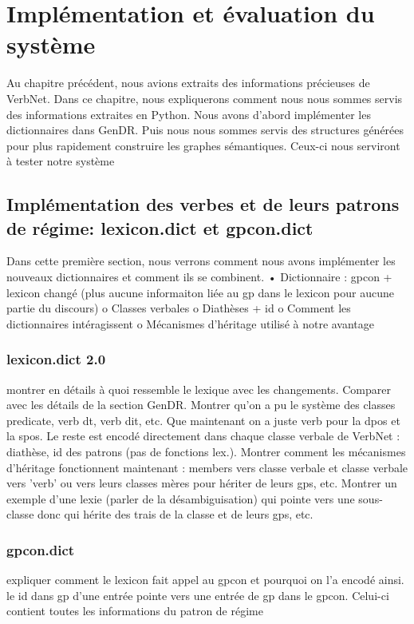 \chapter{Implémentation et évaluation du système}\label{eval}

Au chapitre précédent, nous avions extraits des informations précieuses de VerbNet. Dans ce chapitre, nous expliquerons comment nous nous sommes servis des informations extraites en Python. Nous avons d'abord implémenter les dictionnaires dans GenDR. Puis nous nous sommes servis des structures générées pour plus rapidement construire les graphes sémantiques. Ceux-ci nous serviront à tester notre système

\section{Implémentation des verbes et de leurs patrons de régime: lexicon.dict et gpcon.dict}

Dans cette première section, nous verrons comment nous avons implémenter les nouveaux dictionnaires et comment ils se combinent.
•	Dictionnaire : gpcon + lexicon changé (plus aucune informaiton liée au gp dans le lexicon pour aucune partie du discours)
o	Classes verbales
o	Diathèses + id
o	Comment les dictionnaires intéragissent
o	Mécanismes d’héritage utilisé à notre avantage

\subsection{lexicon.dict 2.0}
montrer en détails à quoi ressemble le lexique avec les changements. Comparer avec les détails de la section GenDR. Montrer qu'on a pu le système des classes predicate, verb dt, verb dit, etc. Que maintenant on a juste verb pour la dpos et la spos. Le reste est encodé directement dans chaque classe verbale de VerbNet : diathèse, id des patrons (pas de fonctions lex.). Montrer comment les mécanismes d'héritage fonctionnent maintenant : members vers classe verbale et classe verbale vers 'verb' ou vers leurs classes mères pour hériter de leurs gps, etc. Montrer un exemple d'une lexie (parler de la désambiguisation) qui pointe vers une sous-classe donc qui hérite des trais de la classe et de leurs gps, etc.

\subsection{gpcon.dict}
expliquer comment le lexicon fait appel au gpcon et pourquoi on l'a encodé ainsi. le id dans gp d'une entrée pointe vers une entrée de gp dans le gpcon. Celui-ci contient toutes les informations du patron de régime

